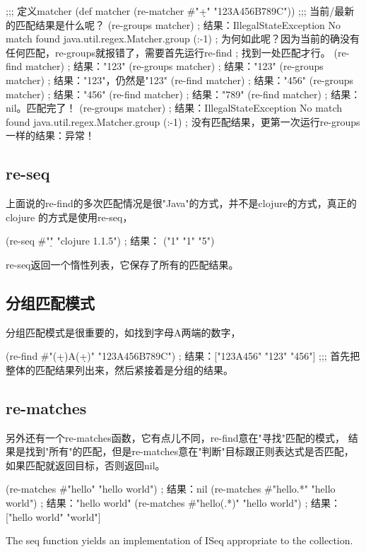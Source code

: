 ﻿\documentclass[a4paper,11pt]{article}
\begin{document}
  \begin{schemecode}
;;; 定义matcher
(def matcher (re-matcher #"\d+" "123A456B789C"))
;;; 当前/最新的匹配结果是什么呢？
(re-groups matcher)
; 结果：IllegalStateException No match found  java.util.regex.Matcher.group (:-1)
; 为何如此呢？因为当前的确没有任何匹配，re-groups就报错了，需要首先运行re-find
; 找到一处匹配才行。
(re-find matcher)
; 结果："123"
(re-groups matcher)
; 结果："123"
(re-groups matcher)
; 结果："123"，仍然是"123"
(re-find matcher)
; 结果："456"
(re-groups matcher)
; 结果："456"
(re-find matcher)
; 结果："789"
(re-find matcher)
; 结果：nil。匹配完了！
(re-groups matcher)
; 结果：IllegalStateException No match found  java.util.regex.Matcher.group (:-1)
; 没有匹配结果，更第一次运行re-groups一样的结果：异常！
  \end{schemecode}

  \subsection[re-seq]{re-seq}
  上面说的re-find的多次匹配情况是很"Java"的方式，并不是clojure的方式，真正的clojure
  的方式是使用re-seq，

  \begin{schemecode}
(re-seq #"\d" "clojure 1.1.5")
; 结果： ("1" "1" "5")
  \end{schemecode}

  re-seq返回一个惰性列表，它保存了所有的匹配结果。

  \subsection[分组匹配模式]{分组匹配模式}
  分组匹配模式是很重要的，如找到字母A两端的数字，

  \begin{schemecode}
(re-find #"(\d+)A(\d+)" "123A456B789C")
; 结果：["123A456" "123" "456"]
;;; 首先把整体的匹配结果列出来，然后紧接着是分组的结果。
  \end{schemecode}

  \subsection[re-matches]{re-matches}
  另外还有一个re-matches函数，它有点儿不同，re-find意在"寻找"匹配的模式，
  结果是找到"所有"的匹配，但是re-matches意在"判断"目标跟正则表达式是否匹配，
  如果匹配就返回目标，否则返回nil。

  \begin{schemecode}
(re-matches #"hello" "hello world")
; 结果：nil
(re-matches #"hello.*" "hello world")
; 结果："hello world"
(re-matches #"hello(.*)" "hello world")
; 结果：["hello world" "world"]
  \end{schemecode}

  


  
  
  
   The seq function yields an implementation of ISeq appropriate to the collection. 
\end{document}
